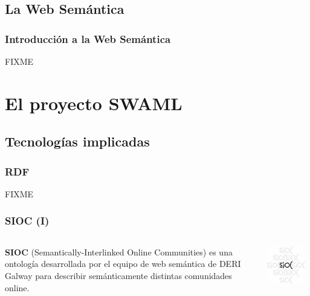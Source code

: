 \documentclass[spanish,notes=hide]{beamer}
\begin{document}
\subsection{La Web Semántica}
\frame
{
  \frametitle{Introducción a la Web Semántica}

  FIXME
}

\section{El proyecto SWAML}

\subsection{Tecnologías implicadas}
\frame
{
  \frametitle{RDF}

  FIXME
}
\frame
{
  \frametitle{SIOC (I)}

  \begin{columns}
   \begin{column}{0.6\textwidth}
     \begin{center}
	\textbf{SIOC} (Semantically-Interlinked Online Communities) es una ontología desarrollada 
	por el equipo de web semántica de DERI Galway para describir semánticamente 
	distintas comunidades online.
     \end{center}
   \end{column}
   \begin{column}{0.4\textwidth}
	\includegraphics[width=0.9\textwidth]{images/sioc.png}
   \end{column}
  \end{columns}
}
\end{document}

